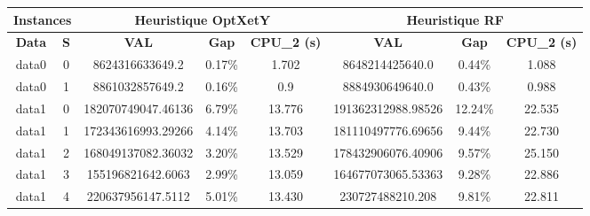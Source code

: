 \begin{table}[h!tbp]
    \centering\small
    \renewcommand{\arraystretch}{1.1}
    \begin{tabular}{|c|c||c|c|c||c|c|c|}
        \hline
        \multicolumn{2}{|c||}{\textbf{Instances}} & \multicolumn{3}{|c||}{\textbf{Heuristique OptXetY}} & \multicolumn{3}{|c|}{\textbf{Heuristique RF}}                                                                                                \\
        \hline
        \textbf{Data}                             & \textbf{S}                                          & \textbf{VAL}                                  & \textbf{Gap} & \textbf{CPU\_2 (s)} & \textbf{VAL}       & \textbf{Gap} & \textbf{CPU\_2 (s)} \\
        \hline
        data0                                     & 0                                                   & 8624316633649.2                               & 0.17\%       & 1.702               & 8648214425640.0    & 0.44\%       & 1.088               \\
        data0                                     & 1                                                   & 8861032857649.2                               & 0.16\%       & 0.9                 & 8884930649640.0    & 0.43\%       & 0.988               \\
        \hline
        data1                                     & 0                                                   & 182070749047.46136                            & 6.79\%       & 13.776              & 191362312988.98526 & 12.24\%      & 22.535              \\
        data1                                     & 1                                                   & 172343616993.29266                            & 4.14\%       & 13.703              & 181110497776.69656 & 9.44\%       & 22.730              \\
        data1                                     & 2                                                   & 168049137082.36032                            & 3.20\%       & 13.529              & 178432906076.40906 & 9.57\%       & 25.150              \\
        data1                                     & 3                                                   & 155196821642.6063                             & 2.99\%       & 13.059              & 164677073065.53363 & 9.28\%       & 22.886              \\
        data1                                     & 4                                                   & 220637956147.5112                             & 5.01\%       & 13.430              & 230727488210.208   & 9.81\%       & 22.811              \\

\end{tabular}
\end{table}
